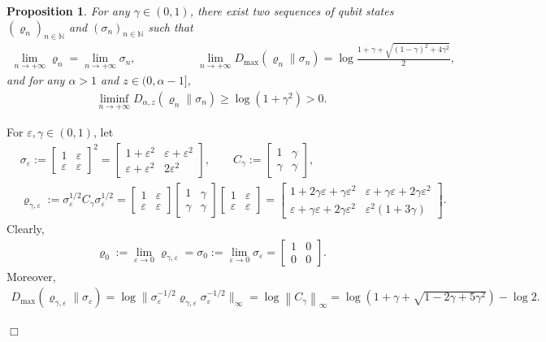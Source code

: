 \documentclass[unsortedaddress,superscriptaddress,pra,notitlepage]{revtex4}
\newtheorem{prop}[definition]{Proposition}
\newenvironment{proof}[1][Proof]{\begin{trivlist}
\item[\hskip \labelsep {\bfseries #1}]}{\hfill$\Box$\end{trivlist}}
\def\bN{\mathbb{N}}
\def\ep{\varepsilon}
\def\rho{\varrho}
\def\bz{\left(}
\def\jz{\right)}
\def\eps{\varepsilon}
\newcommand{\ds}{\mbox{ }\mbox{ }}
\newcommand{\norm}[1]{\left\| #1\right\|}
\newcommand{\snorm}[1]{\| #1\|}
\begin{document}
\begin{prop}%
For any $\gamma\in(0,1)$, there exist 
two sequences of qubit states $(\rho_n)_{n\in\bN}$ and 
$(\sigma_n)_{n\in\bN}$ such that 
\begin{align}\label{counter1}
\lim_{n\to+\infty}\rho_n=\lim_{n\to+\infty}\sigma_n,\ds\ds\ds\ds
\lim_{n\to+\infty}D_{\max}(\rho_n\|\sigma_n)
=\log\frac{1+\gamma+\sqrt{(1-\gamma)^2+4\gamma^2}}{2},
\end{align}
and for any $\alpha>1$ and $z\in(0,\alpha-1]$, 
\begin{align}\label{counter2}
\liminf_{n\to+\infty}D_{\alpha,z}(\rho_n\|\sigma_n)\ge\log(1+\gamma^2)>0.
\end{align}
\end{prop}
\begin{proof}
For $\ep,\gamma\in(0,1)$, let
\begin{align*}
&\sigma_\eps:=\begin{bmatrix}1&\eps\\\eps&\eps\end{bmatrix}^2
=\begin{bmatrix}1+\eps^2&\eps+\eps^2\\\eps+\eps^2&2\eps^2\end{bmatrix},\qquad
C_{\gamma }:=\begin{bmatrix}1& \gamma \\ \gamma & \gamma \end{bmatrix}, \\
&\rho_{\gamma,\eps}:=\sigma_\eps^{1/2}C_{\gamma }\sigma_\eps^{1/2}
=\begin{bmatrix}1&\eps\\\eps&\eps\end{bmatrix}
\begin{bmatrix}1& \gamma \\ \gamma & \gamma \end{bmatrix}
\begin{bmatrix}1&\eps\\\eps&\eps\end{bmatrix}
=\begin{bmatrix}1+2\gamma\eps+\gamma\eps^2 &
\ep+\gamma\ep+2\gamma\ep^2 \\
\ep+\gamma\ep+2\gamma\ep^2 
&\ep^2(1+3\gamma)
\end{bmatrix}.
\end{align*}
Clearly,
\begin{align*}
\rho_0:=\lim_{\ep\to 0}\rho_{\gamma,\ep}=
\sigma_0:=\lim_{\ep\to 0}\sigma_{\ep}=
\begin{bmatrix}1&0\\0&0\end{bmatrix}.
\end{align*}
Moreover,
\begin{align}\label{Dmax limit}
D_{\max}(\rho_{\gamma,\eps}\|\sigma_{\ep})
=
\log\snorm{\sigma_\eps^{-1/2}\rho_{\gamma,\eps}\sigma_\eps^{-1/2}}_{\infty}
=
\log\norm{C_{\gamma}}_{\infty}
=
\log\bz 1+\gamma+\sqrt{1-2\gamma+5\gamma^2}\jz-\log 2.
\end{align}


\end{proof}
\end{document}
